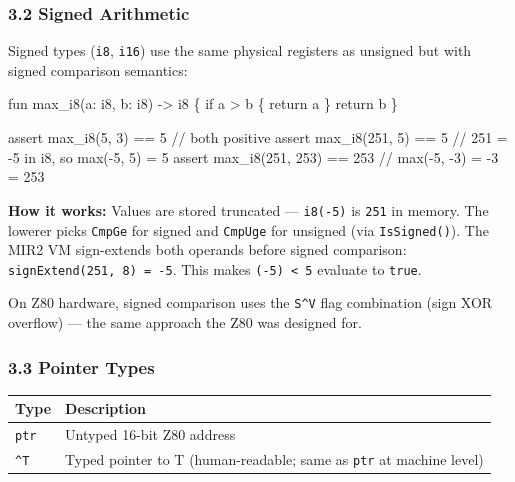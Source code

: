 \documentclass[
  11pt,
  a4paper,
]{report}
\newenvironment{Shaded}{\begin{snugshade}\small}{\end{snugshade}}
\newcommand{\NormalTok}[1]{#1}
\begin{document}
\subsubsection{3.2 Signed Arithmetic}\label{signed-arithmetic}

Signed types (\texttt{i8}, \texttt{i16}) use the same physical registers
as unsigned but with signed comparison semantics:

\begin{Shaded}
\begin{Highlighting}[]
\NormalTok{fun max\_i8(a: i8, b: i8) {-}\textgreater{} i8 \{}
\NormalTok{    if a \textgreater{} b \{ return a \}}
\NormalTok{    return b}
\NormalTok{\}}

\NormalTok{assert max\_i8(5, 3) == 5         // both positive}
\NormalTok{assert max\_i8(251, 5) == 5       // 251 = {-}5 in i8, so max({-}5, 5) = 5}
\NormalTok{assert max\_i8(251, 253) == 253   // max({-}5, {-}3) = {-}3 = 253}
\end{Highlighting}
\end{Shaded}

\textbf{How it works:} Values are stored truncated --- \texttt{i8(-5)}
is \texttt{251} in memory. The lowerer picks \texttt{CmpGe} for signed
and \texttt{CmpUge} for unsigned (via \texttt{IsSigned()}). The MIR2 VM
sign-extends both operands before signed comparison:
\texttt{signExtend(251,\ 8)\ =\ -5}. This makes
\texttt{(-5)\ \textless{}\ 5} evaluate to \texttt{true}.

On Z80 hardware, signed comparison uses the \texttt{S\^{}V} flag
combination (sign XOR overflow) --- the same approach the Z80 was
designed for.

\subsubsection{3.3 Pointer Types}\label{pointer-types}

\begin{longtable}[]{@{}
  >{\raggedright\arraybackslash}p{}
  >{\raggedright\arraybackslash}p{}@{}}
\toprule\noalign{}
\begin{minipage}[b]{\linewidth}\raggedright
Type
\end{minipage} & \begin{minipage}[b]{\linewidth}\raggedright
Description
\end{minipage} \\
\midrule\noalign{}
\endhead
\bottomrule\noalign{}
\endlastfoot
\texttt{ptr} & Untyped 16-bit Z80 address \\
\texttt{\^{}T} & Typed pointer to T (human-readable; same as
\texttt{ptr} at machine level) \\
\end{longtable}
\end{document}
